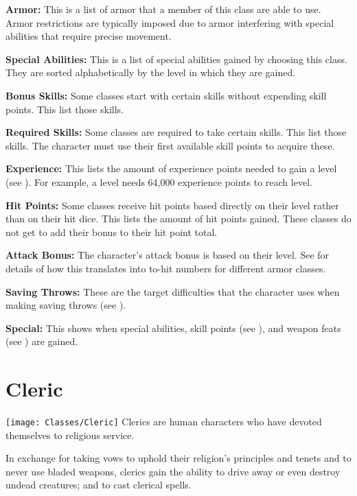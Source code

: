 \begin{multicols*}{2}
\textbf{Armor:} This is a list of armor that a member of this class are able to use. Armor restrictions are typically imposed due to armor interfering with special abilities that require precise movement.

\textbf{Special Abilities:} This is a list of special abilities gained by choosing this class. They are sorted alphabetically by the level in which they are gained.

\textbf{Bonus Skills:} Some classes start with certain skills without expending skill points. This list those skills.

\textbf{Required Skills:} Some classes are required to take certain skills. This list those skills. The character must use their first available skill points to acquire these.

\textbf{Experience:} This lists the amount of experience points needed to gain a level (see ). For example, a  level  needs 64,000 experience points to reach  level.

\textbf{Hit Points:} Some classes receive hit points based directly on their level rather than on their hit dice. This lists the amount of hit points gained. These classes do not get to add their  bonus to their hit point total.

\textbf{Attack Bonus:} The character’s attack bonus is based on their level. See  for details of how this translates into to-hit numbers for different armor classes.

\textbf{Saving Throws:} These are the target difficulties that the character uses when making saving throws (see ).

\textbf{Special:} This shows when special abilities, skill points (see ), and weapon feats (see ) are gained.

\section{Cleric}\label{class:Cleric}
\texttt{[image: Classes/Cleric]}
Clerics are human characters who have devoted themselves to religious service.

In exchange for taking vows to uphold their religion’s principles and tenets and to never use bladed weapons, clerics gain the ability to drive away or even destroy undead creatures; and to cast clerical spells.


\end{multicols*}
